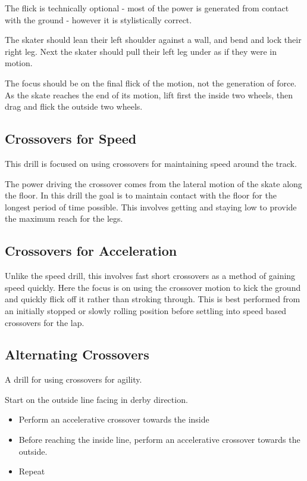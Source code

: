 The flick is technically optional - most of the power is generated from contact with the ground - however it is stylistically correct.  

The skater should lean their left shoulder against a wall, and bend and lock their right leg. 
Next the skater should pull their left leg under as if they were in motion.     

The focus should be on the final flick of the motion, not the generation of force.   
As the skate reaches the end of its motion, lift first the inside two wheels, then drag and flick the outside two wheels.     


\subsection*{Crossovers for Speed}
\label{drill:crossovers/forwards/speed}
This drill is focused on using crossovers for maintaining speed around the track.  

The power driving the crossover comes from the lateral motion of the skate along the floor. 
In this drill the goal is to maintain contact with the floor for the longest period of time possible.
This involves getting and staying low to provide the maximum reach for the legs.  

\subsection*{Crossovers for Acceleration}
\label{drill:crossovers/forwards/accel}
Unlike the speed drill, this involves fast short crossovers as a method of gaining speed quickly.    
Here the focus is on using the crossover motion to kick the ground and quickly flick off it rather than stroking through.  
This is best performed from an initially stopped or slowly rolling position before settling into speed based crossovers for the lap.



\subsection*{Alternating Crossovers}
\label{drill:crossovers/forwards/alternating}
A drill for using crossovers for agility. 

Start on the outside line facing in derby direction.  
\begin{itemize}
\item Perform an accelerative crossover towards the inside  
\item Before reaching the inside line, perform an accelerative crossover towards the outside. 
\item Repeat
\end{itemize}
